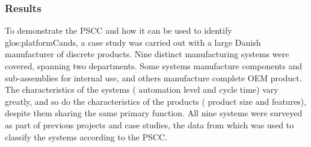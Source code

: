 \subsubsection*{Results}
To demonstrate the PSCC and how it can be used to identify \gls{glos:platformCand}s, a case study was carried out with a large Danish manufacturer of discrete products.
Nine distinct manufacturing systems were covered, spanning two departments.
Some systems manufacture components and sub-assemblies for internal use, and others manufacture complete OEM product.
The characteristics of the systems (\eg{} automation level and cycle time) vary greatly, and so do the characteristics of the products (\eg{} product size and features), despite them sharing the same primary function.
All nine systems were surveyed as part of previous projects and case studies, the data from which was used to classify the systems according to the PSCC.

